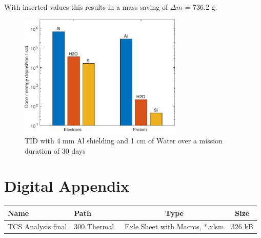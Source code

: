 With inserted values this results in a mass saving of \(\Delta m\) = 736.2 g.

\begin{figure}[htp]
	\centering
	\includegraphics[width=0.7\textwidth]{Media/J_Improvements_Ice}
	\caption{TID with 4 mm Al shielding and 1 cm of Water over a mission duration of 30 days}
	\label{fig:Radiation_Improvements_Ice}
\end{figure}

\clearpage

\setcounter{figure}{0}
\setcounter{table}{0}

\section{Digital Appendix}		\label{app:DigitalAppendix}

\begin{table}[htb]
	\centering
	\begin{tabular}{llcc}
		\hline
		Name  & Path & Type & Size  \\ \hline
		TCS Analysis final & 300 Thermal\ & Exle Sheet with Macros, *.xlsm & 326 kB  \\   \hline
	\end{tabular}
\end{table}

\cleardoublepage